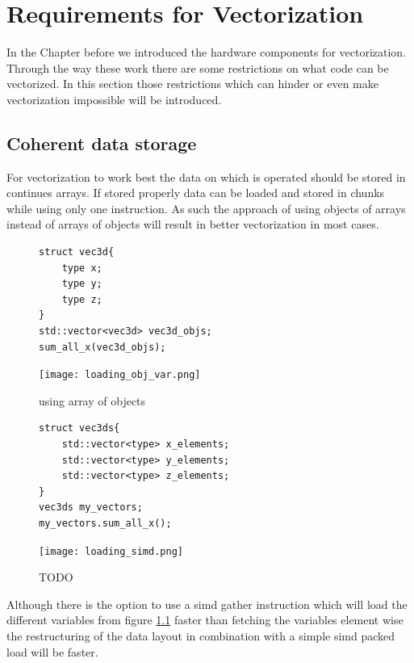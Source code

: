 \documentclass[
	12pt,
	a4paper,
	BCOR10mm,
	DIV14,
	headsepline,
	usegeometry,
]{scrreprt}
\begin{document}

\chapter{Requirements for Vectorization}
In the Chapter before we introduced  the hardware components for vectorization. Through the way
these work there are some restrictions on what code can be vectorized. In this section those
restrictions which can hinder or even make vectorization impossible will be introduced.
\section{Coherent data storage}
For vectorization to work best the data on which is operated should be stored in continues arrays.
If stored properly data can be loaded and stored in chunks while using only one instruction. As
such the approach of using objects of arrays instead of arrays of objects will result in better
vectorization in most cases. 
\begin{figure}[h]
    \centering
    \begin{minipage}[t]{.45\textwidth}
        \begin{verbatim}
struct vec3d{
    type x;
    type y;
    type z;
}
std::vector<vec3d> vec3d_objs;
sum_all_x(vec3d_objs);
        \end{verbatim}

        \texttt{[image: loading\_obj\_var.png]}
        \caption{using array of objects}
    \end{minipage}
    \begin{minipage}[t]{.45\textwidth}
        \begin{verbatim}
struct vec3ds{
    std::vector<type> x_elements;
    std::vector<type> y_elements;
    std::vector<type> z_elements;
}
vec3ds my_vectors;
my_vectors.sum_all_x();
        \end{verbatim}
        \texttt{[image: loading\_simd.png]}
    \caption{TODO}
    \label{fig:obj_load}
    \end{minipage}
\end{figure} 
Although there is the option to use a simd gather instruction which will load the different
variables from figure \ref{fig:obj_load} faster than fetching the variables element wise the
restructuring of the data layout in combination with a simple simd packed load will be faster.
\end{document}
